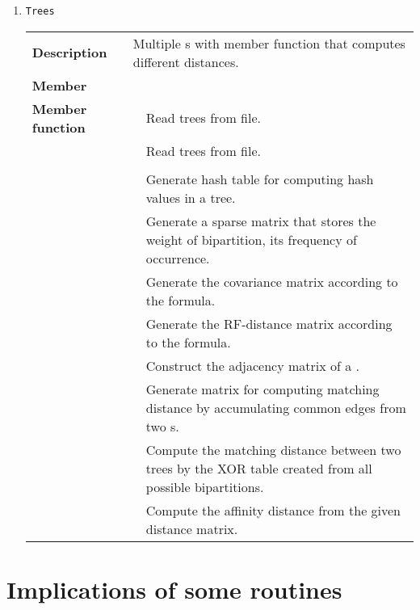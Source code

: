 \documentclass[11pt,a4paper]{article}
\newcommand{\myuline}[1]{%
	\uline{\phantom{#1}}%
	\llap{\contour{white}{#1}}%
}
\newcommand{\mrref}[1]{\texttt{#1}\label{#1}}
\newcommand{\rref}[1]{\hyperref[#1]{\textcolor{blue}{\myuline{\texttt{#1}}}}}
\newcommand{\tref}[2]{\hyperref[#2]{\textcolor{blue}{\myuline{\texttt{#1}}}}}
\theoremstyle{definition}
\theoremstyle{definition}
\numberwithin{equation}{section}
\begin{document}
\begin{enumerate}
\begin{tabular}{>{\bfseries}lp{}p{}}
			\end{tabular}

		\item \mrref{Trees}
		
			\begin{tabular}{>{\bfseries}lp{0.3\textwidth}p{}}
				Description & \multicolumn{2}{p{0.6\textwidth}}{Multiple \rref{NEWICKTREE}s with member function that computes different distances.} \\
				Member &   & \\
				Member function & \rref{initialTrees} & Read trees from file. \\
				& \rref{ReadTrees} & Read trees from file. \\
				& \tref{compute\_numofbipart}{computenumofbipart} & \\
				& \tref{Compute\_Hash}{ComputeHash} & Generate hash table for computing hash values in a tree.\\
				& \tref{Compute\_Bipart\_Matrix}{ComputeBipartMatrix} & Generate a sparse matrix that stores the weight of bipartition, its frequency of occurrence.\\
				& \tref{Compute\_Bipart\_Covariance}{ComputeBipartCovariance} & Generate the covariance matrix according to the formula.\\
				& \tref{Compute\_RF\_dist\_by\_hash}{ComputeRFdistbyhash} & Generate the RF-distance matrix according to the formula.\\
				& \rref{pttree} & Construct the adjacency matrix of a \rref{Ptree}.\\
				& \tref{compute\_matrix}{computematrix} & Generate matrix for computing matching distance by accumulating common edges from two \rref{Ptree}s.\\
				& \tref{Compute\_Matching\_dist}{ComputeMatchingdist} & Compute the matching distance between two trees by the XOR table created from all possible bipartitions.\\ 
				& \tref{Compute\_Affinity\_dist}{ComputeAffinitydist} & Compute the affinity distance from the given distance matrix.\\
			\end{tabular}
	
		
	\end{enumerate}

	
	\section*{Implications of some routines}
	
\end{document}
